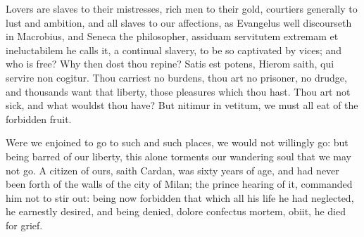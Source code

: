 {Lovers are slaves to their mistresses, rich men to their gold,
courtiers generally to lust and ambition, and all slaves to our
affections, as Evangelus well discourseth in Macrobius, and
Seneca the philosopher, assiduam servitutem extremam et
ineluctabilem he calls it, a continual slavery, to be so captivated by
vices; and who is free? Why then dost thou repine? Satis est potens,
Hierom saith, qui servire non cogitur. Thou carriest no burdens, thou
art no prisoner, no drudge, and thousands want that liberty, those
pleasures which thou hast. Thou art not sick, and what wouldst thou
have? But nitimur in vetitum, we must all eat of the forbidden fruit.

Were we enjoined to go to such and such places, we would not willingly
go: but being barred of our liberty, this alone torments our wandering
soul that we may not go. A citizen of ours, saith Cardan, was
sixty years of age, and had never been forth of the walls of the city
of Milan; the prince hearing of it, commanded him not to stir out:
being now forbidden that which all his life he had neglected, he
earnestly desired, and being denied, dolore confectus mortem, obiit, he
died for grief.

}
